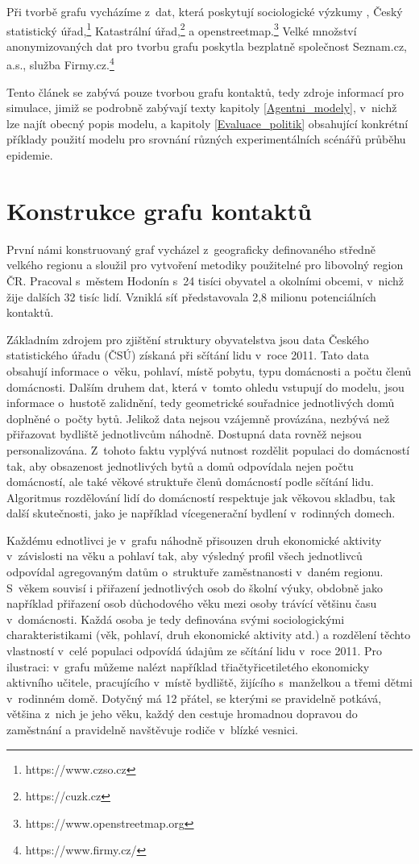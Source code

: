 Při tvorbě grafu vycházíme z~dat, která poskytují sociologické výzkumy \cite{paqcovid, zaj:mediancovid, zaj:medianlife}, Český statistický úřad,\footnote{https://www.czso.cz} Katastrální úřad,\footnote{https://cuzk.cz} a openstreetmap.\footnote{https://www.openstreetmap.org} Velké množství anonymizovaných dat pro tvorbu grafu poskytla bezplatně společnost Seznam.cz, a.s., služba Firmy.cz.\footnote{https://www.firmy.cz/}

Tento článek se zabývá pouze tvorbou grafu kontaktů, tedy zdroje informací pro simulace, jimiž se podrobně zabývají texty kapitoly \ref{Agentni_modely}, v~nichž lze najít obecný popis modelu, a kapitoly \ref{Evaluace_politik} obsahující konkrétní příklady použití modelu pro srovnání různých experimentálních scénářů průběhu epidemie.

\section*{Konstrukce grafu kontaktů}

První námi konstruovaný graf vycházel z~geograficky definovaného středně velkého regionu a sloužil pro vytvoření metodiky použitelné pro libovolný region ČR. Pracoval s~městem Hodonín s~24 tisíci obyvatel a okolními obcemi, v~nichž žije dalších 32 tisíc lidí. Vzniklá síť představovala 2,8 milionu potenciálních kontaktů. 

Základním zdrojem pro zjištění struktury obyvatelstva jsou data Českého statistického úřadu (ČSÚ) získaná při sčítání lidu v~roce 2011. Tato data obsahují informace o~věku, pohlaví, místě pobytu, typu domácnosti a počtu členů domácnosti. Dalším druhem dat, která v~tomto ohledu vstupují do modelu, jsou informace o~hustotě zalidnění, tedy geometrické souřadnice jednotlivých domů doplněné o~počty bytů. Jelikož data nejsou vzájemně provázána, nezbývá než přiřazovat bydliště jednotlivcům náhodně. Dostupná data rovněž nejsou personalizována. Z~tohoto faktu vyplývá nutnost rozdělit populaci do domácností tak, aby obsazenost jednotlivých bytů a domů odpovídala nejen počtu domácností, ale také věkové struktuře členů domácností podle sčítání lidu. Algoritmus rozdělování lidí do domácností respektuje jak věkovou skladbu, tak další skutečnosti, jako je například vícegenerační bydlení v~rodinných domech.

Každému ednotlivci je v~grafu náhodně přisouzen druh ekonomické aktivity v~závislosti na věku a pohlaví tak, aby výsledný profil všech jednotlivců odpovídal agregovaným datům o~struktuře zaměstnanosti v~daném regionu. S~věkem souvisí i přiřazení jednotlivých osob do školní výuky, obdobně jako například přiřazení osob důchodového věku mezi osoby trávící většinu času v~domácnosti. Každá osoba je tedy definována svými sociologickými charakteristikami (věk, pohlaví, druh ekonomické aktivity atd.) a rozdělení těchto vlastností v~celé populaci odpovídá údajům ze sčítání lidu v~roce 2011. Pro ilustraci: v~grafu můžeme nalézt například třiačtyřicetiletého ekonomicky aktivního učitele, pracujícího v~místě bydliště, žijícího s~manželkou a třemi dětmi v~rodinném domě. Dotyčný má 12 přátel, se kterými se pravidelně potkává, většina z~nich je jeho věku, každý den cestuje hromadnou dopravou do zaměstnání a pravidelně navštěvuje rodiče v~blízké vesnici.

